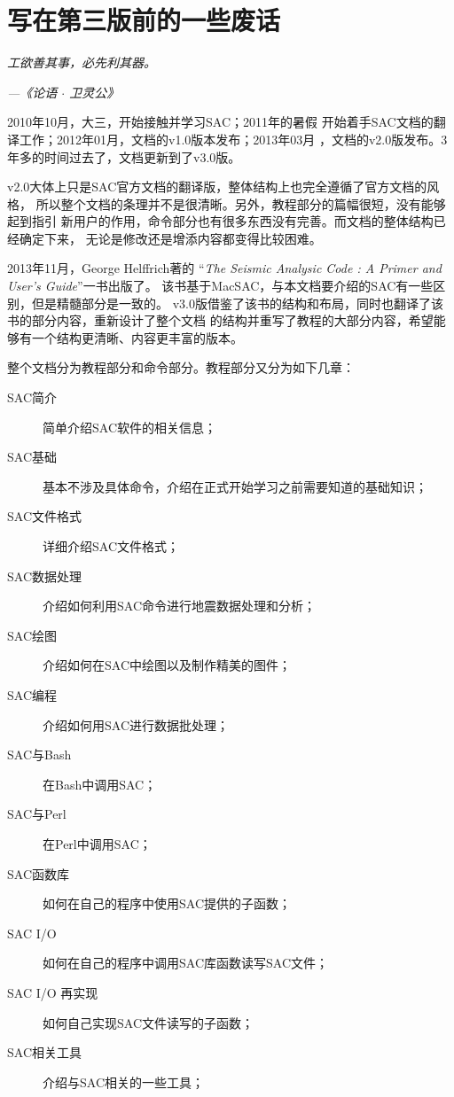 \section*{\centering 写在第三版前的一些废话}

\begin{shadequote*}
\Large\emph{
工欲善其事，必先利其器。
}
\par\hfill\emph{\normalsize---《论语 $\cdot$ 卫灵公》}
\end{shadequote*}

2010年10月，大三，开始接触并学习SAC；2011年的暑假
开始着手SAC文档的翻译工作；2012年01月，文档的v1.0版本发布；2013年03月
，文档的v2.0版发布。3年多的时间过去了，文档更新到了v3.0版。

v2.0大体上只是SAC官方文档的翻译版，整体结构上也完全遵循了官方文档的风格，
所以整个文档的条理并不是很清晰。另外，教程部分的篇幅很短，没有能够起到指引
新用户的作用，命令部分也有很多东西没有完善。而文档的整体结构已经确定下来，
无论是修改还是增添内容都变得比较困难。

2013年11月，George Helffrich著的
``\emph{The Seismic Analysic Code : A Primer and User's Guide}''一书出版了。
该书基于MacSAC，与本文档要介绍的SAC有一些区别，但是精髓部分是一致的。
v3.0版借鉴了该书的结构和布局，同时也翻译了该书的部分内容，重新设计了整个文档
的结构并重写了教程的大部分内容，希望能够有一个结构更清晰、内容更丰富的版本。

整个文档分为教程部分和命令部分。教程部分又分为如下几章：
\begin{description}
\item[SAC简介] 简单介绍SAC软件的相关信息；
\item[SAC基础] 基本不涉及具体命令，介绍在正式开始学习之前需要知道的基础知识；
\item[SAC文件格式] 详细介绍SAC文件格式；
\item[SAC数据处理] 介绍如何利用SAC命令进行地震数据处理和分析；
\item[SAC绘图] 介绍如何在SAC中绘图以及制作精美的图件；
\item[SAC编程] 介绍如何用SAC进行数据批处理；
\item[SAC与Bash] 在Bash中调用SAC；
\item[SAC与Perl] 在Perl中调用SAC；
\item[SAC函数库] 如何在自己的程序中使用SAC提供的子函数；
\item[SAC I/O] 如何在自己的程序中调用SAC库函数读写SAC文件；
\item[SAC I/O 再实现] 如何自己实现SAC文件读写的子函数；
\item[SAC相关工具] 介绍与SAC相关的一些工具；
\end{description}

